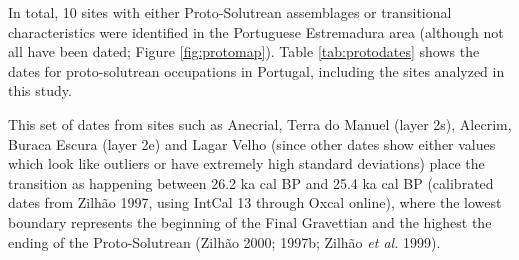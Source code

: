 \documentclass[12pt,twoside]{reedthesis}
\begin{document}
In total, 10 sites with either Proto-Solutrean assemblages or transitional characteristics were identified in the Portuguese Estremadura area (although not all have been dated; Figure \ref{fig:protomap}). Table \ref{tab:protodates} shows the dates for proto-solutrean occupations in Portugal, including the sites analyzed in this study.

This set of dates from sites such as Anecrial, Terra do Manuel (layer 2s), Alecrim, Buraca Escura (layer 2e) and Lagar Velho (since other dates show either values which look like outliers or have extremely high standard deviations) place the transition as happening between 26.2 ka cal BP and 25.4 ka cal BP (calibrated dates from Zilhão 1997, using IntCal 13 through Oxcal online), where the lowest boundary represents the beginning of the Final Gravettian and the highest the ending of the Proto-Solutrean (Zilhão 2000; 1997b; Zilhão \emph{et al.} 1999).
\end{document}
